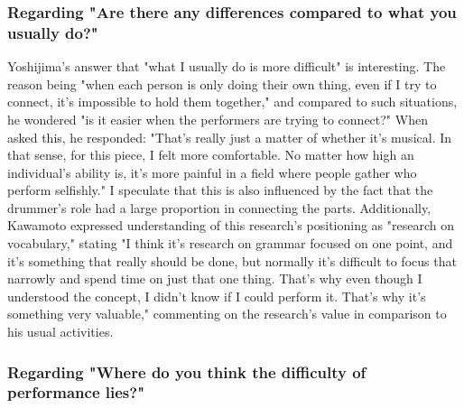 \subsubsection{Regarding "Are there any differences compared to what you usually do?"}

Yoshijima's answer that "what I usually do is more difficult" is interesting. The reason being "when each person is only doing their own thing, even if I try to connect, it's impossible to hold them together," and compared to such situations, he wondered "is it easier when the performers are trying to connect?" When asked this, he responded: "That's really just a matter of whether it's musical. In that sense, for this piece, I felt more comfortable. No matter how high an individual's ability is, it's more painful in a field where people gather who perform selfishly." I speculate that this is also influenced by the fact that the drummer's role had a large proportion in connecting the parts. Additionally, Kawamoto expressed understanding of this research's positioning as "research on vocabulary," stating "I think it's research on grammar focused on one point, and it's something that really should be done, but normally it's difficult to focus that narrowly and spend time on just that one thing. That's why even though I understood the concept, I didn't know if I could perform it. That's why it's something very valuable," commenting on the research's value in comparison to his usual activities.

\subsubsection{Regarding "Where do you think the difficulty of performance lies?"}

